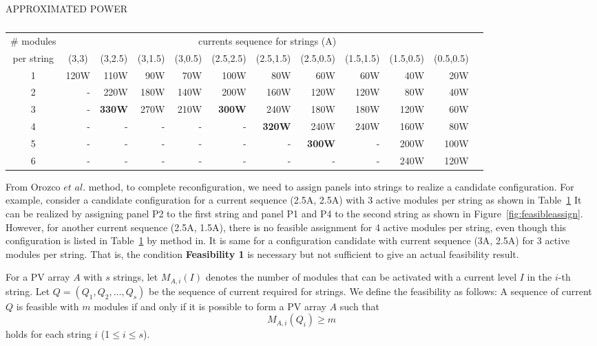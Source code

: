 \documentclass[journal]{IEEEtran}
\begin{document}
\begin{table}[t]
  \caption{}
  \centerline{APPROXIMATED POWER}
  \vskip5pt
\label{tab:power-matrix}
\centering
\begin{tabular}{c|rrrrrrrrrrr}
\hline\hline	
\# modules & 	\multicolumn{10}{c}{currents sequence for strings (A)} \\ 																
per string		&	\multicolumn{1}{c}{(3,3)}	&	\multicolumn{1}{c}{(3,2.5)}	&	\multicolumn{1}{c}{(3,1.5)}	&	\multicolumn{1}{c}{(3,0.5)}	&	\multicolumn{1}{c}{(2.5,2.5)}	&	\multicolumn{1}{c}{(2.5,1.5)}	&	\multicolumn{1}{c}{(2.5,0.5)}	&	\multicolumn{1}{c}{(1.5,1.5)}	&	\multicolumn{1}{c}{(1.5,0.5)}	&	\multicolumn{1}{c}{(0.5,0.5)}	\\ \hline
	1	&	120W	&	110W	&	90W	&	70W	&	100W	&	80W	&	60W	&	60W	&	40W	&	20W	\\ \hline
	2	&	-	&	220W	&	180W	&	140W	&	200W	&	160W	&	120W	&	120W	&	80W	&	40W	\\ \hline	3	&	-	&\textbf{330W}&	270W	&	210W	&	\textbf{300W}	&	240W	&	180W	&	180W	&	120W	&	60W	\\ \hline
4	&	-	&	-	&	-	&	-	&	-	&	\textbf{320W}	&	240W	&	240W	&	160W	&	80W	\\ \hline
	 5	&	-	&	-	&	-	&	-	&	-	&	-	&	\textbf{300W}	&	-	&	200W	&	100W	\\ \hline
	6	&	-	&	-	&	-	&	-	&	-	&	-	&	-	&	-	&	240W	&	120W	\\ \hline
\end{tabular}
\end{table}

From Orozco $et$ $al.$ method, to complete reconfiguration, we need to assign panels into strings to realize a candidate configuration.
For example, consider a candidate configuration for a current sequence (2.5A, 2.5A) with 3 active modules per string as shown in Table~\ref{tab:power-matrix}
It can be realized by assigning panel P2 to the first string and panel P1 and P4 to the second string as shown in Figure~\ref{fig:feasibleassign}.
However, for another current sequence (2.5A, 1.5A), there is no feasible assignment for 4 active modules per string, even though this configuration is listed in Table~\ref{tab:power-matrix} by method in\cite{Orozco-Gutierrez2016}.
It is same for a configuration candidate with current sequence (3A, 2.5A) for 3 active modules per string.
That is, the condition \textbf{Feasibility 1} is necessary but not sufficient to give an actual feasibility result.

For a PV array $A$ with $s$ strings, let $M_{A,i}(I)$ denotes the number of modules that can be activated with a current level $I$ in the $i$-th string.
Let $Q = (Q_1,Q_2,\dots,Q_s)$ be the sequence of current required for strings.
We define the feasibility as follows: A sequence of current $Q$ is feasible with $m$ modules if and only if it is possible to form a PV array $A$ such that
\begin{equation}
  M_{A,i}(Q_i)\geq m
  \label{eq:3}
\end{equation}
holds for each string $i$ (1$\leq i \leq s$).
\end{document}
